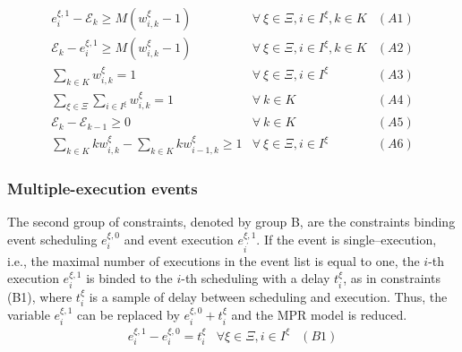 \documentclass[]{interact}
\theoremstyle{plain}%
\theoremstyle{definition}
\theoremstyle{remark}
\begin{document}
\begin{eqnarray}
e^{\xi,1}_i-\mathcal{E}_k\ge M(w^{\xi}_{i,k}-1) & \forall\ \xi\in\Xi,i\in I^{\xi},k\in K&(A1)\nonumber\\
\mathcal{E}_k-e^{\xi,1}_i\ge M(w^{\xi}_{i,k}-1) & \forall\ \xi\in\Xi,i\in I^{\xi},k\in K&(A2)\nonumber\\
\sum_{k\in K} w^{\xi}_{i,k} =1& \forall\ \xi\in\Xi,i\in I^{\xi}&(A3)\nonumber\\
\sum_{\xi\in \Xi}\sum_{i\in I^{\xi}} w^{\xi}_{i,k} =1&\forall\ k\in K&(A4)\nonumber\\
\mathcal{E}_{k}-\mathcal{E}_{k-1}\ge 0&\forall\ k\in K&(A5)\nonumber\\
\sum_{k\in K} kw^{\xi}_{i,k} - \sum_{k\in K} kw^{\xi}_{i-1,k} \ge 1&  \forall\ \xi\in\Xi,i\in I^{\xi}&(A6)\nonumber
\end{eqnarray}

\subsubsection{Multiple-execution events}
The second group of constraints, denoted by group B, are the constraints binding event scheduling $e^{\xi,0}_i$ and event execution $e^{\xi,1}_{i^{'}}$. If the event is single--execution, i.e., the maximal number of executions in the event list is equal to one, the $i$-th execution $e^{\xi,1}_i$ is binded to the $i$-th scheduling with a delay $t^{\xi}_{i}$, as in constraints (B1), where $t^{\xi}_{i}$ is a sample of delay between scheduling and execution. Thus, the variable $e^{\xi,1}_{i} $ can be replaced by $e^{\xi,0}_{i} + t^{\xi}_{i}$ and the MPR model is reduced.
\begin{eqnarray}
e^{\xi,1}_{i} - e^{\xi,0}_{i} = t^{\xi}_{i} & \forall \xi\in\Xi, i\in I^{\xi}&(B1) \nonumber
\end{eqnarray}
\end{document}
